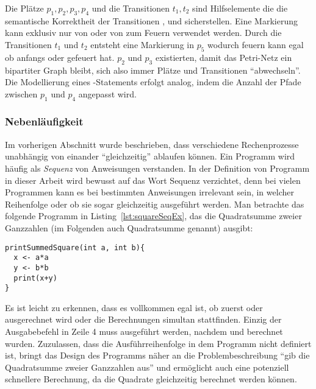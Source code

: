 Die Plätze $p_1,p_2,p_3,p_4$ und die Transitionen $t_1,t_2$ sind Hilfselemente die die semantische Korrektheit der Transitionen ,  und  sicherstellen. Eine Markierung kann exklusiv nur von  oder von  zum Feuern verwendet werden. Durch die Transitionen $t_1$ und $t_2$ entsteht eine Markierung in $p_5$ wodurch  feuern kann egal ob anfangs  oder  gefeuert hat. $p_2$ und $p_3$ existierten, damit das Petri-Netz ein bipartiter Graph bleibt, sich also immer Plätze und Transitionen \enquote{abwechseln}. Die Modellierung eines -Statements erfolgt analog, indem die Anzahl der Pfade zwischen $p_1$ und $p_4$ angepasst wird.

\subsubsection{Nebenläufigkeit}\label{sec:nebenl}
Im vorherigen Abschnitt wurde beschrieben, dass verschiedene Rechenprozesse unabhängig von einander \enquote{gleichzeitig} ablaufen können. Ein Programm wird häufig als \emph{Sequenz} von Anweisungen verstanden. In der Definition von Programm in dieser Arbeit wird bewusst auf das Wort Sequenz verzichtet, denn bei vielen Programmen kann es bei bestimmten Anweisungen irrelevant sein, in welcher Reihenfolge oder ob sie sogar gleichzeitig ausgeführt werden. Man betrachte das folgende Programm in Listing~\ref{lst:squareSeqEx}, das die Quadratsumme zweier Ganzzahlen (im Folgenden auch Quadratsumme genannt) ausgibt: 
\begin{lstlisting}[caption={Beispiel eines Programms das die Summe von Quadraten zweier Ganzzahlen berechnet. Die Berechnung der Quadratzahlen wird nacheinander in einer fest definierten Sequenz durchgeführt.}, label={lst:squareSeqEx}]
printSummedSquare(int a, int b){
  x <- a*a
  y <- b*b
  print(x+y)
}
\end{lstlisting}
Es ist leicht zu erkennen, dass es vollkommen egal ist, ob zuerst  oder  ausgerechnet wird oder die Berechnungen simultan stattfinden. Einzig der Ausgabebefehl in Zeile 4 muss ausgeführt werden, nachdem  und  berechnet wurden. Zuzulassen, dass die Ausführreihenfolge in dem Programm nicht definiert ist, bringt das Design des Programms näher an die Problembeschreibung \enquote{gib die Quadratsumme zweier Ganzzahlen aus} und ermöglicht auch eine potenziell schnellere Berechnung, da die Quadrate gleichzeitig berechnet werden können.


